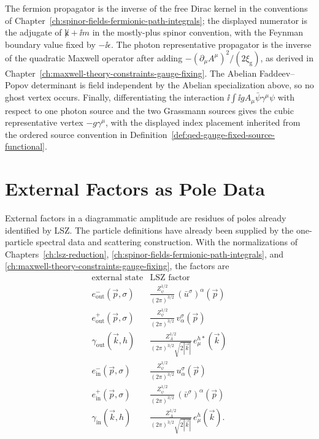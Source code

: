 The fermion propagator is the inverse of the free Dirac kernel in the
conventions of Chapter~\ref{ch:spinor-fields-fermionic-path-integrals}; the
displayed numerator is the adjugate of \(\not k+\ii m\) in the mostly-plus
spinor convention, with the Feynman boundary value fixed by
\(-\ii\epsilon\).  The photon representative propagator is the inverse of the
quadratic Maxwell operator after adding
\(-(\partial_\mu A^\mu)^2/(2\xi_{\mathrm g})\), as derived in
Chapter~\ref{ch:maxwell-theory-constraints-gauge-fixing}.  The Abelian
Faddeev--Popov determinant is field independent by the Abelian specialization
above, so no ghost vertex occurs.  Finally, differentiating the interaction
\(\ii\int \ii g A_\mu\bar\psi\gamma^\mu\psi\) with respect to one photon
source and the two Grassmann sources gives the cubic representative vertex
\(-g\gamma^\mu\), with the displayed index placement inherited from the
ordered source convention in
Definition~\ref{def:qed-gauge-fixed-source-functional}.

\section{External Factors as Pole Data}

\begin{definition}
\label{def:qed-external-pole-residue-factors}
External factors in a diagrammatic amplitude are residues of poles already
identified by LSZ. The particle definitions have already been supplied by the
one-particle spectral data and scattering construction. With the normalizations
of Chapters~\ref{ch:lsz-reduction},
\ref{ch:spinor-fields-fermionic-path-integrals}, and
\ref{ch:maxwell-theory-constraints-gauge-fixing}, the factors are
\[
\begin{array}{c|c}
\text{external state} & \text{LSZ factor} \\ \hline
e^-_{\mathrm{out}}(\vec p,\sigma)
&
\displaystyle
\frac{Z_\psi^{1/2}}{(2\pi)^{3/2}}\,
(\bar u^\sigma)^\alpha(\vec p)
\\[1.1em]
e^+_{\mathrm{out}}(\vec p,\sigma)
&
\displaystyle
\frac{Z_\psi^{1/2}}{(2\pi)^{3/2}}\,
v^\sigma_\alpha(\vec p)
\\[1.1em]
\gamma_{\mathrm{out}}(\vec k,h)
&
\displaystyle
\frac{Z_A^{1/2}}{(2\pi)^{3/2}\sqrt{2|\vec k|}}\,
e_\mu^{h*}(\vec k)
\\[1.1em]
e^-_{\mathrm{in}}(\vec p,\sigma)
&
\displaystyle
\frac{Z_\psi^{1/2}}{(2\pi)^{3/2}}\,
u^\sigma_\alpha(\vec p)
\\[1.1em]
e^+_{\mathrm{in}}(\vec p,\sigma)
&
\displaystyle
\frac{Z_\psi^{1/2}}{(2\pi)^{3/2}}\,
(\bar v^\sigma)^\alpha(\vec p)
\\[1.1em]
\gamma_{\mathrm{in}}(\vec k,h)
&
\displaystyle
\frac{Z_A^{1/2}}{(2\pi)^{3/2}\sqrt{2|\vec k|}}\,
e_\mu^h(\vec k).
\end{array}
\]
\end{definition}

